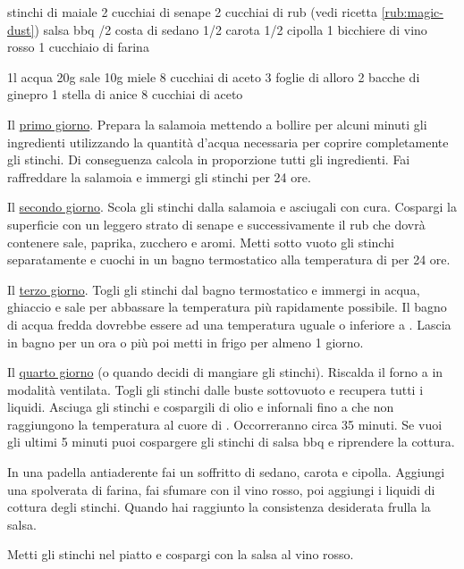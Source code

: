 \begin{ingreds}
	 stinchi di maiale 
	2 cucchiai di senape 
	2 cucchiai di rub (vedi ricetta \ref{rub:magic-dust})
	salsa bbq
	/2 costa di sedano 
	1/2 carota 
	1/2 cipolla 
	1 bicchiere di vino rosso
	1 cucchiaio di farina 

\columnbreak
	1l acqua
	20g sale
	10g miele 
	8 cucchiai di aceto 
	3 foglie di alloro 
	2 bacche di ginepro 
	1 stella di anice 
	8 cucchiai di aceto
\end{ingreds}

\begin{method}
Il \underline{primo giorno}. Prepara la salamoia mettendo a bollire per alcuni minuti gli ingredienti utilizzando la quantità d'acqua necessaria per coprire completamente gli stinchi. Di conseguenza calcola in proporzione tutti gli ingredienti. Fai raffreddare la salamoia e immergi gli stinchi per 24 ore.

Il \underline{secondo giorno}. Scola gli stinchi dalla salamoia e asciugali con cura. Cospargi la superficie con un leggero strato di senape e successivamente il rub che dovrà contenere sale, paprika, zucchero e aromi. Metti sotto vuoto gli stinchi separatamente e cuochi in un bagno termostatico alla temperatura di  per 24 ore.

Il \underline{terzo giorno}. Togli gli stinchi dal bagno termostatico e immergi in acqua, ghiaccio e sale per abbassare la temperatura più rapidamente possibile. Il bagno di acqua fredda dovrebbe essere ad una temperatura uguale o inferiore a . Lascia in bagno per un ora o più poi metti in frigo per almeno 1 giorno.

Il \underline{quarto giorno} (o quando decidi di mangiare gli stinchi). Riscalda il forno a  in modalità ventilata. Togli gli stinchi dalle buste sottovuoto e recupera tutti i liquidi. Asciuga gli stinchi e cospargili di olio e infornali fino a che non raggiungono la temperatura al cuore di . Occorreranno circa 35 minuti. Se vuoi gli ultimi 5 minuti puoi cospargere gli stinchi di salsa bbq e riprendere la cottura.

In una padella antiaderente fai un soffritto di sedano, carota e cipolla. Aggiungi una spolverata di farina, fai sfumare con il vino rosso, poi aggiungi i liquidi di cottura degli stinchi. Quando hai raggiunto la consistenza desiderata frulla la salsa.

Metti gli stinchi nel piatto e cospargi con la salsa al vino rosso.
\end{method}



